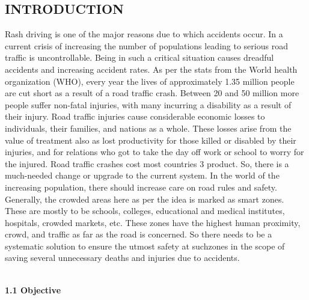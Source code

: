 \documentclass[a4paper,12pt, English]{article}
\begin{document}


\newpage

\pagestyle{fancy}
\fancyfoot[R]{\footnotesize\thepage}
\begin{center}
\section{\Large INTRODUCTION}
\end{center}
\begin{normalsize}

\tabIn Rash driving is one of the major reasons due to which accidents occur. In a current crisis of
increasing the number of populations leading to serious road traffic is uncontrollable. Being
in such a critical situation causes dreadful accidents and increasing accident rates. As per the
stats from the World health organization (WHO), every year the lives of approximately 1.35
million people are cut short as a result of a road traffic crash. Between 20 and 50 million more
people suffer non-fatal injuries, with many incurring a disability as a result of their injury. Road
traffic injuries cause considerable economic losses to individuals, their families, and nations as
a whole. These losses arise from the value of treatment also as lost productivity for those killed
or disabled by their injuries, and for relations who got to take the day off work or school to
worry for the injured. Road traffic crashes cost most countries 3%
product. So, there is a much-needed change or upgrade to the current system. In the world of
the increasing population, there should increase care on road rules and safety. Generally, the
crowded areas here as per the idea is marked as smart zones. These are mostly to be schools,
colleges, educational and medical institutes, hospitals, crowded markets, etc. These zones have
the highest human proximity, crowd, and traffic as far as the road is concerned. So there needs
to be a systematic solution to ensure the utmost safety at suchzones in the scope of saving
several unnecessary deaths and injuries due to accidents.
 \\
 \\
 \begin{large}
\textbf{1.1 Objective}
\end{large}
\newline

\end{normalsize}
\end{document}
